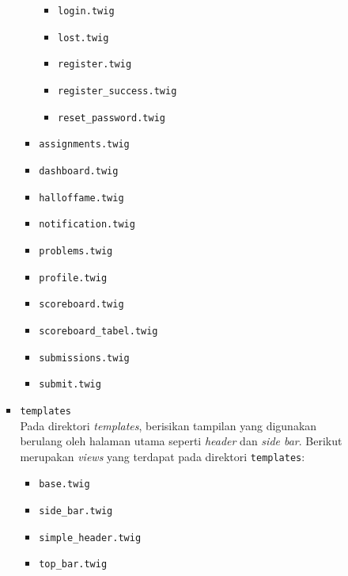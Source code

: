 \documentclass[a4paper,twoside]{article}
\begin{document}
\begin{enumerate}
\begin{itemize}
\begin{itemize}
\begin{itemize}
				                        \begin{itemize}
					                        \item \verb|login.twig|
					                        \item \verb|lost.twig|
					                        \item \verb|register.twig|
					                        \item \verb|register_success.twig|
					                        \item \verb|reset_password.twig|
				                        \end{itemize}

				                  \item \verb|assignments.twig|
				                  \item \verb|dashboard.twig|
				                  \item \verb|halloffame.twig|
				                  \item \verb|notification.twig|
				                  \item \verb|problems.twig|
				                  \item \verb|profile.twig|
				                  \item \verb|scoreboard.twig|
				                  \item \verb|scoreboard_tabel.twig|
				                  \item \verb|submissions.twig|
				                  \item \verb|submit.twig|
			                  \end{itemize}

			                  \vspace{0.25cm}

			            \item \verb|templates| \\
			                  Pada direktori \textit{templates}, berisikan tampilan yang digunakan berulang oleh halaman utama seperti \textit{header} dan \textit{side bar}. Berikut merupakan \textit{views} yang terdapat pada direktori \verb|templates|:

			                  \begin{itemize}
				                  \item \verb|base.twig|
				                  \item \verb|side_bar.twig|
				                  \item \verb|simple_header.twig|
				                  \item \verb|top_bar.twig|
			                  \end{itemize}


\end{itemize}
\end{itemize}
\end{enumerate}
\end{document}
